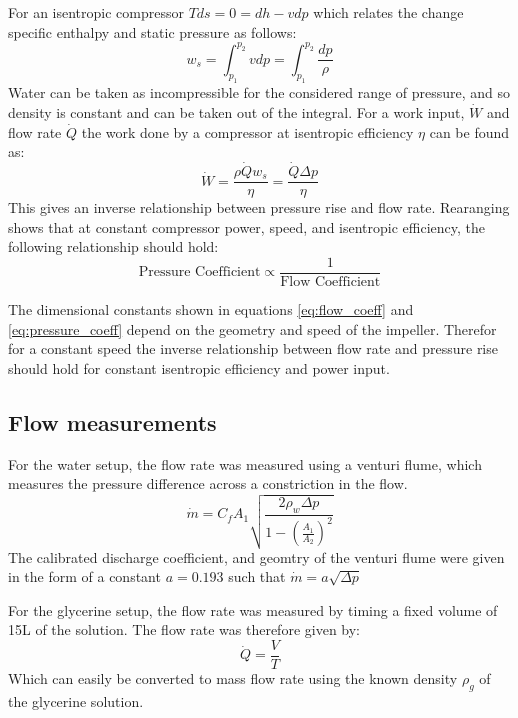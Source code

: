 \documentclass{article}
\begin{document}
For an isentropic compressor $Tds = 0 = dh - vdp$ which relates the change specific enthalpy and static pressure as follows:
\begin{equation}
    w_s = \int_{p_1}^{p_2} vdp = \int_{p_1}^{p_2} \frac{dp}{\rho}
\end{equation}
Water can be taken as incompressible for the considered range of pressure, and so density is constant and can be taken out of the integral.
For a work input, $\dot{W}$ and flow rate $\dot{Q}$ the work done by a compressor at isentropic efficiency $\eta$ can be found as:
\begin{equation}
    \dot{W} = \frac{\rho \dot{Q} w_s}{\eta} = \frac{\dot{Q} \Delta p}{\eta} 
\end{equation}
This gives an inverse relationship between pressure rise and flow rate.
Rearanging shows that at constant compressor power, speed, and isentropic efficiency, the following relationship should hold:
\begin{equation}
    \text{Pressure Coefficient} \propto \frac{1}{\text{Flow Coefficient}} \label{eq:inverse_relationship}
\end{equation}

The dimensional constants shown in equations \ref{eq:flow_coeff} and \ref{eq:pressure_coeff} depend on the geometry and speed of the impeller.
Therefor for a constant speed the inverse relationship between flow rate and pressure rise should hold for constant isentropic efficiency and power input.

\subsection{Flow measurements}

For the water setup, the flow rate was measured using a venturi flume, which measures the pressure difference across a constriction in the flow.
\begin{equation}
    \dot{m} = C_f A_1 \sqrt{\frac{2\rho_w \Delta p}{1 - \left( \frac{A_1}{A_2} \right)^2}}
\end{equation}
The calibrated discharge coefficient, and geomtry of the venturi flume were given in the form of a constant $a=0.193$ such that $\dot{m}=a \sqrt{\Delta p}$

For the glycerine setup, the flow rate was measured by timing a fixed volume of 15L of the solution.
The flow rate was therefore given by:
\begin{equation}
    \dot{Q} = \frac{V}{T}
\end{equation}
Which can easily be converted to mass flow rate using the known density $\rho_g$ of the glycerine solution.
\end{document}
